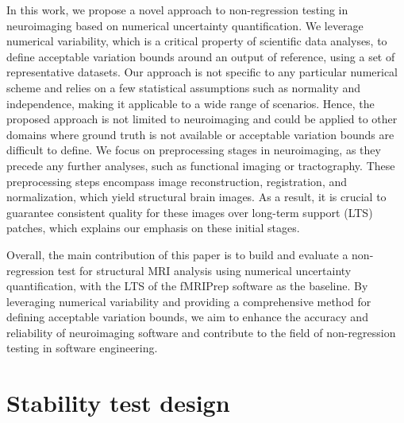 \documentclass[lettersize,journal]{IEEEtran}
\newcommand{\fmriprep}{fMRIPrep\xspace}
\begin{document}
In this work, we propose a novel approach to non-regression testing in neuroimaging based on numerical uncertainty quantification. We leverage numerical variability, which is a critical property of scientific data analyses, to define acceptable variation bounds around an output of reference, using a set of representative datasets. Our approach is not specific to any particular numerical scheme and relies on a few statistical assumptions such as normality and independence, making it applicable to a wide range of scenarios. Hence, the proposed approach is not limited to neuroimaging and could be applied to other domains where ground truth is not available or acceptable variation bounds are difficult to define. We focus on preprocessing stages in neuroimaging, as they precede any further analyses, such as functional imaging or tractography. These preprocessing steps encompass image reconstruction, registration, and normalization, which yield structural brain images. As a result, it is crucial to guarantee consistent quality for these images over long-term support (LTS) patches, which explains our emphasis on these initial stages.

Overall, the main contribution of this paper is to build and evaluate a non-regression test for structural MRI analysis using numerical uncertainty quantification, with the LTS of the \fmriprep software as the baseline. By leveraging numerical variability and providing a comprehensive method for defining acceptable variation bounds, we aim to enhance the accuracy and reliability of neuroimaging software and contribute to the field of non-regression testing in software engineering.




\section{Stability test design}
\end{document}
